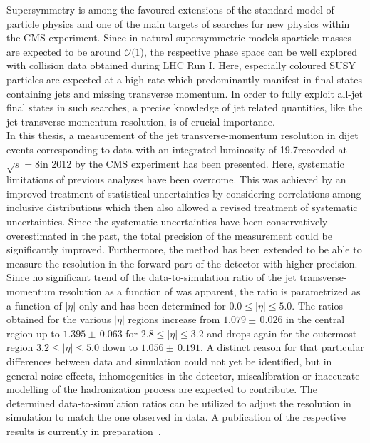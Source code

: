 Supersymmetry is among the favoured extensions of the standard model of particle physics and one of the main targets of searches for new physics within the CMS experiment. Since in natural supersymmetric models sparticle masses are expected to be around $\mathcal{O}(1$\tev), the respective phase space can be well explored with \pp collision data obtained during LHC Run I. Here, especially coloured SUSY particles are expected at a high rate which predominantly manifest in final states containing jets and missing transverse momentum. In order to fully exploit all-jet final states in such searches, a precise knowledge of jet related quantities, like the jet transverse-momentum resolution, is of crucial importance. \\
In this thesis, a measurement of the jet transverse-momentum resolution in dijet events corresponding to data with an integrated luminosity of 19.7\fbinv recorded at $\sqrt{s}=8$\tev in 2012 by the CMS experiment has been presented. Here, systematic limitations of previous analyses have been overcome. This was achieved by an improved treatment of statistical uncertainties by considering correlations among inclusive distributions which then also allowed a revised treatment of systematic uncertainties. Since the systematic uncertainties have been conservatively overestimated in the past, the total precision of the measurement could be significantly improved. Furthermore, the method has been extended to be able to measure the resolution in the forward part of the detector with higher precision. Since no significant trend of the data-to-simulation ratio of the jet transverse-momentum resolution as a function of \ptave was apparent, the ratio is parametrized as a function of $|\eta|$ only and has been determined for $0.0 \leq |\eta| \leq 5.0$. The ratios obtained for the various $|\eta|$ regions increase from $1.079\pm \, 0.026$ in the central region up to $1.395\pm \, 0.063$ for $2.8 \leq |\eta| \leq 3.2$ and drops again for the outermost region $3.2 \leq |\eta| \leq 5.0$ down to $1.056\pm \, 0.191$. A distinct reason for that particular differences between data and simulation could not yet be identified, but in general noise effects, inhomogenities in the detector, miscalibration or inaccurate modelling of the hadronization process are expected to contribute. The determined data-to-simulation ratios can be utilized to adjust the resolution in simulation to match the one observed in data. A publication of the respective results is currently in preparation~\cite{CMS-JME-13-004}. \\
